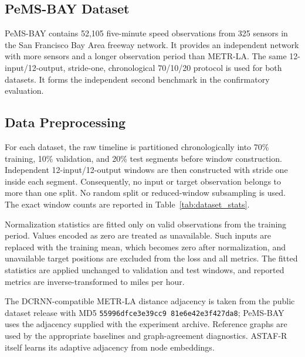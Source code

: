 \documentclass[fleqn,10pt]{wlscirep}
\newenvironment{changedcontent}{\color{changeblue}}{}
\begin{document}
\begin{changedcontent}
\subsection{PeMS-BAY Dataset}
PeMS-BAY contains 52,105 five-minute speed observations from 325 sensors in
the San Francisco Bay Area freeway network. It provides an independent
network with more sensors and a longer observation period than METR-LA. The
same 12-input/12-output, stride-one, chronological 70/10/20 protocol is used
for both datasets. It forms the independent second benchmark in the
confirmatory evaluation.
\end{changedcontent}
\subsection{Data Preprocessing}



\begin{changedcontent}
For each dataset, the raw timeline is partitioned chronologically into 70\%
training, 10\% validation, and 20\% test segments before window construction.
Independent 12-input/12-output windows are then constructed with stride one
inside each segment. Consequently, no input or target observation belongs to
more than one split. No random split or reduced-window subsampling is used.
The exact window counts are reported in Table~\ref{tab:dataset_stats}.

Normalization statistics are fitted only on valid observations from the
training period. Values encoded as zero are treated as unavailable. Such
inputs are replaced with the training mean, which becomes zero after
normalization, and unavailable target positions are excluded from the loss
and all metrics. The fitted statistics are applied unchanged to validation
and test windows, and reported metrics are inverse-transformed to miles per
hour.

The DCRNN-compatible METR-LA distance adjacency is taken from the public
dataset release with MD5
\texttt{55996dfc\allowbreak e3e39cc9\allowbreak
81e6e42e\allowbreak 3f427da8}; PeMS-BAY uses the adjacency
supplied with the experiment archive. Reference graphs are used by the
appropriate baselines and graph-agreement diagnostics. ASTAF-R itself learns
its adaptive adjacency from node embeddings.
\end{changedcontent}
\end{document}
